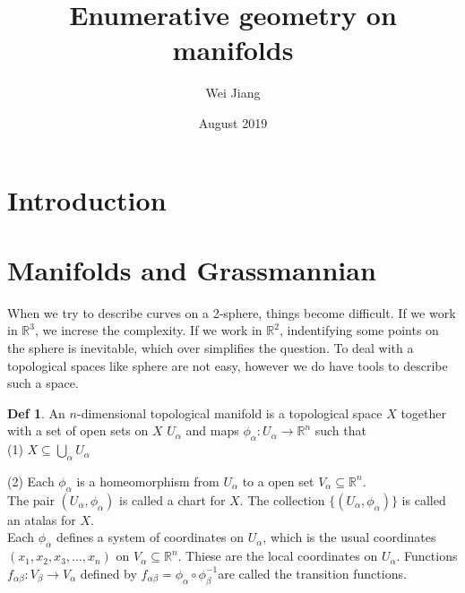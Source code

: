 \documentclass{article}
\title{Enumerative geometry on manifolds}
\author{Wei Jiang}
\date{August 2019}
\begin{document}
\theoremstyle{definition}
\newtheorem{df}{Def}[section]
\newtheorem{eg}[df]{Eg}

\theoremstyle{plain}
\newtheorem{thm}[df]{Thm}
\newtheorem{lm}[df]{Lem}

\tableofcontents
\newpage

\section{Introduction}

\newpage
\section{Manifolds and Grassmannian}
 

When we try to describe curves on a 2-sphere, things become difficult. If we 
work in $\mathbb{R}^{3}$, we increse the complexity. If we work in $\mathbb{R}^{2}$,
indentifying some points on the sphere is inevitable, which over simplifies 
the question. To deal with a topological spaces like sphere are not easy, however 
we do have tools to describe such a space.

\begin{df}
An $n$-dimensional topological manifold is a topological space $X$
together with a set of open sets on $X$ ${U_{\alpha}}$ 
and maps $\phi_{\alpha} : U_{\alpha} \longrightarrow \mathbb{R}^{n} $
such that \\

(1) $X \subseteq \bigcup_{\alpha} U_{\alpha} $

(2) Each $\phi_{\alpha}$ is a homeomorphism from $U_{\alpha}$ to a open set 
$V_{\alpha} \subseteq \mathbb{R}^{n} $. \\

The pair $(U_{\alpha},\phi_{\alpha})$ is called a chart for $X$. The collection 
$\{(U_{\alpha},\phi_{\alpha})\}$ is called an atalas for $X$. \\

Each $\phi_{\alpha}$ defines a system of coordinates on $U_{\alpha}$, which is
the usual coordinates $(x_{1},x_{2},x_{3},...,x_{n})$ on 
$V_{\alpha} \subseteq \mathbb{R}^{n}$. Thiese are the local coordinates on $U_{\alpha}$.
Functions $f_{\alpha\beta} : V_{\beta}\longrightarrow V_{\alpha}$ defined by 
$f_{\alpha\beta} = \phi_{\alpha} \circ \phi_{\beta}^{-1}$are called the transition
 functions.

\end{df}
\end{document}
